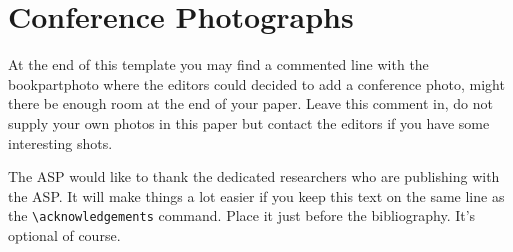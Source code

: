 \documentclass[11pt,twoside]{article}
\begin{document}
\section{Conference Photographs}

At the end of this template you may find a commented line with the bookpartphoto where the editors could decided to add a conference photo,
might there be enough room at the end of your paper. Leave this comment in, do not supply your own photos in this paper but contact the editors
if you have some interesting shots.

\acknowledgements The ASP would like to thank the dedicated researchers who are publishing with the ASP.  It will make things a lot easier if you keep this text on the same line as the \verb"\acknowledgements" command. Place it just before the bibliography. It's optional of course.



\end{document}
